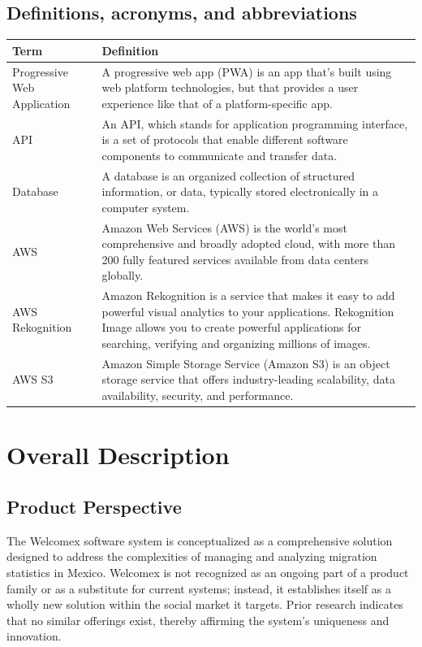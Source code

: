 \documentclass{scrreprt}
\begin{document}
\section{Definitions, acronyms, and abbreviations}
\setlength{\arrayrulewidth}{0.5mm}
\setlength{\tabcolsep}{18pt}
\renewcommand{\arraystretch}{1.5}
\begin{tabular}{ |p{3cm}|p{9cm}|}
 \hline
  Term & Definition\\
 \hline
 Progressive Web Application & A progressive web app (PWA) is an app that's built using web platform technologies, but that provides a user experience like that of a platform-specific app.\\
 \hline
 API & An API, which stands for application programming interface, is a set of protocols that enable different software components to communicate and transfer data. \\
 \hline
 Database & A database is an organized collection of structured information, or data, typically stored electronically in a computer system.\\
  \hline
 AWS & Amazon Web Services (AWS) is the world’s most comprehensive and broadly adopted cloud, with more than 200 fully featured services available from data centers globally.\\
 \hline
 AWS Rekognition & Amazon Rekognition is a service that makes it easy to add powerful visual analytics to your applications. Rekognition Image allows you to create powerful applications for searching, verifying and organizing millions of images.\\
\hline
 AWS S3 & Amazon Simple Storage Service (Amazon S3) is an object storage service that offers industry-leading scalability, data availability, security, and performance.\\
 \hline
\end{tabular}

\chapter{Overall Description}
\section{Product Perspective}
The Welcomex software system is conceptualized as a comprehensive solution designed to address the complexities of managing and analyzing migration statistics in Mexico.  Welcomex is not recognized as an ongoing part of a product family or as a substitute for current systems; instead, it establishes itself as a wholly new solution within the social market it targets. Prior research indicates that no similar offerings exist, thereby affirming the system's uniqueness and innovation.
\end{document}

